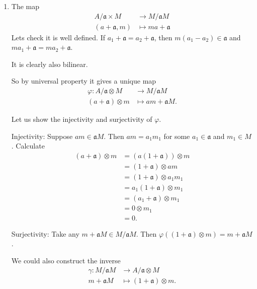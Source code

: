 \begin{exercise}{3}
\begin{enumerate}
        \item The map
            \begin{align*}
                A / \mathfrak{a} \times M &\rightarrow M / \mathfrak{a}M \\
                (a + \mathfrak{a}, m) &\mapsto m a + \mathfrak{a}
            \end{align*}
            Lets check it is well defined. If $a_1 + \mathfrak{a} = a_2 +
            \mathfrak{a}$, then $m (a_1 - a_2) \in \mathfrak{a}$ and $m a_1 +
            \mathfrak{a} = m a_2 + \mathfrak{a}$.

            It is clearly also bilinear.

            So by universal property it gives a unique map
            \begin{align*}
                \varphi \colon A / \mathfrak{a} \otimes M &\rightarrow M /
                \mathfrak{a}M \\
                (a + \mathfrak{a}) \otimes m &\mapsto a m + \mathfrak{a}M.
            \end{align*}

            Let us show the injectivity and surjectivity of $\varphi$.

            Injectivity: Suppose $a m \in \mathfrak{a}M$. Then $a m = a_1 m_1$
            for some $a_1 \in \mathfrak{a}$ and $m_1 \in M$. Calculate
            \begin{align*}
                (a + \mathfrak{a}) \otimes m &= (a(1 + \mathfrak{a})) \otimes m
                \\
                &= (1 + \mathfrak{a}) \otimes am \\
                &= (1 + \mathfrak{a}) \otimes a_1 m_1 \\
                &= a_1 (1 + \mathfrak{a}) \otimes m_1 \\
                &= (a_1 + \mathfrak{a}) \otimes m_1 \\
                &= 0 \otimes m_1 \\
                &= 0.
            \end{align*}

            Surjectivity:
            Take any $m + \mathfrak{a}M \in M/\mathfrak{a}M$. Then $\varphi((1 +
            \mathfrak{a}) \otimes m) = m + \mathfrak{a}M$.

            We could also construct the inverse
            \begin{align*}
                \gamma \colon M/\mathfrak{a}M &\rightarrow A/\mathfrak{a}
                \otimes M \\
                m + \mathfrak{a}M &\mapsto (1 + \mathfrak{a}) \otimes m.
            \end{align*}
    \end{enumerate}
\end{exercise}

